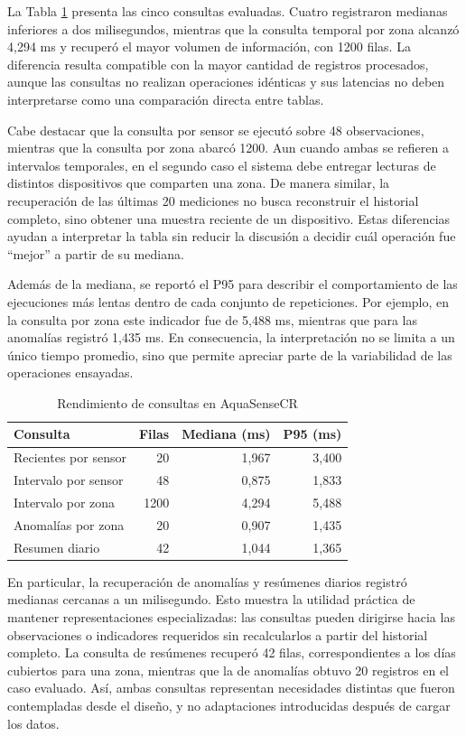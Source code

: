 \documentclass[conference]{IEEEtran}
\begin{document}
La Tabla \ref{tab:rendimiento} presenta las cinco consultas evaluadas. Cuatro registraron medianas inferiores a dos milisegundos, mientras que la consulta temporal por zona alcanzó 4,294 ms y recuperó el mayor volumen de información, con 1200 filas. La diferencia resulta compatible con la mayor cantidad de registros procesados, aunque las consultas no realizan operaciones idénticas y sus latencias no deben interpretarse como una comparación directa entre tablas.

Cabe destacar que la consulta por sensor se ejecutó sobre 48 observaciones, mientras que la consulta por zona abarcó 1200. Aun cuando ambas se refieren a intervalos temporales, en el segundo caso el sistema debe entregar lecturas de distintos dispositivos que comparten una zona. De manera similar, la recuperación de las últimas 20 mediciones no busca reconstruir el historial completo, sino obtener una muestra reciente de un dispositivo. Estas diferencias ayudan a interpretar la tabla sin reducir la discusión a decidir cuál operación fue ``mejor'' a partir de su mediana.

Además de la mediana, se reportó el P95 para describir el comportamiento de las ejecuciones más lentas dentro de cada conjunto de repeticiones. Por ejemplo, en la consulta por zona este indicador fue de 5,488 ms, mientras que para las anomalías registró 1,435 ms. En consecuencia, la interpretación no se limita a un único tiempo promedio, sino que permite apreciar parte de la variabilidad de las operaciones ensayadas.

\begin{table}[!htbp]
\caption{Rendimiento de consultas en AquaSenseCR}
\label{tab:rendimiento}
\centering
\footnotesize
\setlength{\tabcolsep}{3pt}
\begin{tabular}{lrrr}
\hline
\textbf{Consulta} & \textbf{Filas} & \textbf{Mediana (ms)} & \textbf{P95 (ms)} \\
\hline
Recientes por sensor & 20 & 1,967 & 3,400 \\
Intervalo por sensor & 48 & 0,875 & 1,833 \\
Intervalo por zona & 1200 & 4,294 & 5,488 \\
Anomalías por zona & 20 & 0,907 & 1,435 \\
Resumen diario & 42 & 1,044 & 1,365 \\
\hline
\end{tabular}
\end{table}

En particular, la recuperación de anomalías y resúmenes diarios registró medianas cercanas a un milisegundo. Esto muestra la utilidad práctica de mantener representaciones especializadas: las consultas pueden dirigirse hacia las observaciones o indicadores requeridos sin recalcularlos a partir del historial completo. La consulta de resúmenes recuperó 42 filas, correspondientes a los días cubiertos para una zona, mientras que la de anomalías obtuvo 20 registros en el caso evaluado. Así, ambas consultas representan necesidades distintas que fueron contempladas desde el diseño, y no adaptaciones introducidas después de cargar los datos.
\end{document}
